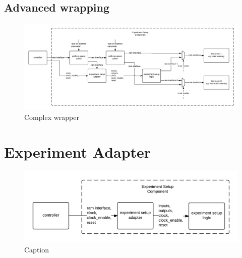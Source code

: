 \documentclass[openright]{template/uva-bachelor-thesis}
\begin{document}
\begin{landscape}
    \section{Advanced wrapping}
    \begin{figure}[h]
        \centering
        \includegraphics[width=\hsize]{img/logic-wrap-extended}
        \caption{Complex wrapper}
        \label{fig:logic-wrap-extended}
    \end{figure}
\end{landscape}

\section{Experiment Adapter}
\begin{figure}[h]
    \centering
    \includegraphics[width=\textwidth]{img/logic-wrap-simple}
    \caption{Caption}
    \label{fig:logic-experiment-adapter}
\end{figure}

\cleardoublepage


\printbibliography
\end{document}
